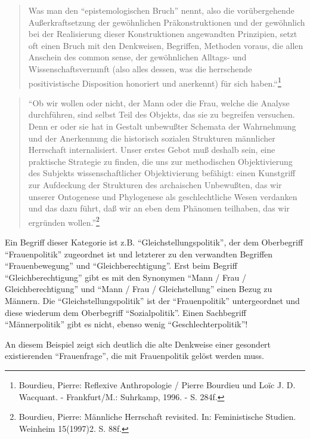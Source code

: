 \documentclass[a4paper,
fontsize=11pt,
oneside,
numbers=noperiodatend,
parskip=half-,
bibliography=totoc,
final
]{scrartcl}
\begin{document}
\begin{quote}
Was man den \enquote{epistemologischen Bruch} nennt, also die
vorübergehende Außerkraftsetzung der gewöhnlichen Präkonstruktionen und
der gewöhnlich bei der Realisierung dieser Konstruktionen angewandten
Prinzipien, setzt oft einen Bruch mit den Denkweisen, Begriffen,
Methoden voraus, die allen Anschein des common sense, der gewöhnlichen
Alltags- und Wissenschaftsvernunft (also alles dessen, was die
herrschende positivistische Disposition honoriert und anerkennt) für
sich haben.``\footnote{Bourdieu, Pierre: Reflexive Anthropologie /
  Pierre Bourdieu und Loïc J. D. Wacquant. - Frankfurt/M.: Suhrkamp,
  1996. - S. 284f.}
\end{quote}

\begin{quote}
\enquote{Ob wir wollen oder nicht, der Mann oder die Frau, welche die
Analyse durchführen, sind selbst Teil des Objekts, das sie zu begreifen
versuchen. Denn er oder sie hat in Gestalt unbewußter Schemata der
Wahrnehmung und der Anerkennung die historisch sozialen Strukturen
männlicher Herrschaft internalisiert. Unser erstes Gebot muß deshalb
sein, eine praktische Strategie zu finden, die uns zur methodischen
Objektivierung des Subjekts wissenschaftlicher Objektivierung befähigt:
einen Kunstgriff zur Aufdeckung der Strukturen des archaischen
Unbewußten, das wir unserer Ontogenese und Phylogenese als
geschlechtliche Wesen verdanken und das dazu führt, daß wir an eben dem
Phänomen teilhaben, das wir ergründen wollen.}\footnote{Bourdieu,
  Pierre: Männliche Herrschaft revisited. In: Feministische Studien.
  Weinheim 15(1997)2. S. 88f.}
\end{quote}

Ein Begriff dieser Kategorie ist z.B. \enquote{Gleichstellungspolitik},
der dem Oberbegriff \enquote{Frauenpolitik} zugeordnet ist und letzterer
zu den verwandten Begriffen \enquote{Frauenbewegung} und
\enquote{Gleichberechtigung}. Erst beim Begriff
\enquote{Gleichberechtigung} gibt es mit den Synonymen \enquote{Mann /
Frau / Gleichberechtigung} und \enquote{Mann / Frau / Gleichstellung}
einen Bezug zu Männern. Die \enquote{Gleichstellungspolitik} ist der
\enquote{Frauenpolitik} untergeordnet und diese wiederum dem Oberbegriff
\enquote{Sozialpolitik}. Einen Sachbegriff \enquote{Männerpolitik} gibt
es nicht, ebenso wenig \enquote{Geschlechterpolitik}!

An diesem Beispiel zeigt sich deutlich die alte Denkweise einer
gesondert existierenden \enquote{Frauenfrage}, die mit Frauenpolitik
gelöst werden muss.
\end{document}
